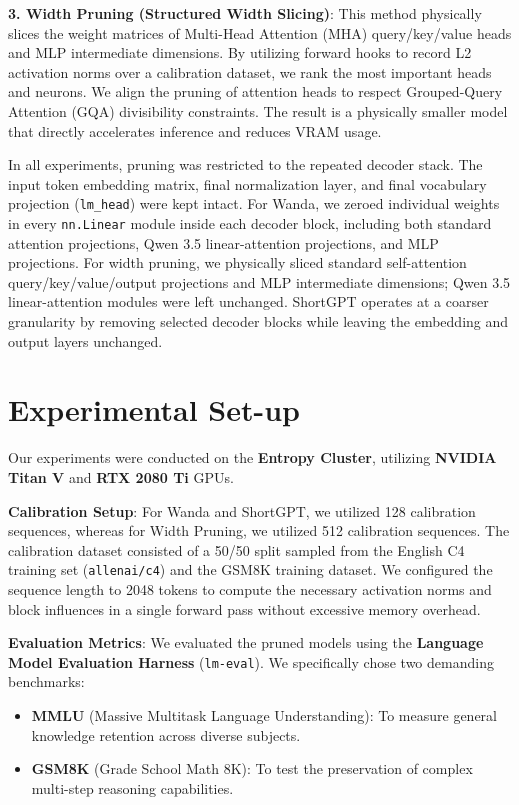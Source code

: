 \documentclass[11pt,a4paper,twocolumn]{article}
\begin{document}
\textbf{3. Width Pruning (Structured Width Slicing)}: This method physically slices the weight matrices of Multi-Head Attention (MHA) query/key/value heads and MLP intermediate dimensions. By utilizing forward hooks to record L2 activation norms over a calibration dataset, we rank the most important heads and neurons. We align the pruning of attention heads to respect Grouped-Query Attention (GQA) divisibility constraints. The result is a physically smaller model that directly accelerates inference and reduces VRAM usage.

In all experiments, pruning was restricted to the repeated decoder stack. The input token embedding matrix, final normalization layer, and final vocabulary projection (\texttt{lm\_head}) were kept intact. For Wanda, we zeroed individual weights in every \texttt{nn.Linear} module inside each decoder block, including both standard attention projections, Qwen 3.5 linear-attention projections, and MLP projections. For width pruning, we physically sliced standard self-attention query/key/value/output projections and MLP intermediate dimensions; Qwen 3.5 linear-attention modules were left unchanged. ShortGPT operates at a coarser granularity by removing selected decoder blocks while leaving the embedding and output layers unchanged.

\section{Experimental Set-up}
Our experiments were conducted on the \textbf{Entropy Cluster}, utilizing \textbf{NVIDIA Titan V} and \textbf{RTX 2080 Ti} GPUs. 

\textbf{Calibration Setup}: For Wanda and ShortGPT, we utilized 128 calibration sequences, whereas for Width Pruning, we utilized 512 calibration sequences. The calibration dataset consisted of a 50/50 split sampled from the English C4 training set (\texttt{allenai/c4}) and the GSM8K training dataset. We configured the sequence length to 2048 tokens to compute the necessary activation norms and block influences in a single forward pass without excessive memory overhead.

\textbf{Evaluation Metrics}: We evaluated the pruned models using the \textbf{Language Model Evaluation Harness} (\texttt{lm-eval}). We specifically chose two demanding benchmarks:
\begin{itemize}[noitemsep]
    \item \textbf{MMLU} (Massive Multitask Language Understanding): To measure general knowledge retention across diverse subjects.
    \item \textbf{GSM8K} (Grade School Math 8K): To test the preservation of complex multi-step reasoning capabilities.
\end{itemize}
\end{document}
